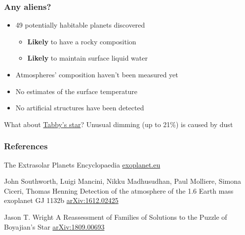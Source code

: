 \documentclass[aspectratio=169]{beamer}
\begin{document}
\begin{frame}
\frametitle{Any aliens?}
\begin{itemize}
\item 49 potentially habitable planets discovered
\begin{itemize}
\item {\bf Likely} to have a rocky composition
\item {\bf Likely} to maintain surface liquid water
\end{itemize}
\item Atmospheres' composition haven't been measured yet
\item No estimates of the surface temperature
\item No artificial structures have been detected
\end{itemize}
\begin{block}{What about \href{http://en.wikipedia.org/wiki/KIC_8462852}{Tabby's star}?}
Unusual dimming (up to 21\%) is caused by dust \cite{arXiv:1809.00693}
\end{block}
\end{frame}

\begin{frame}[allowframebreaks]
\frametitle{References}
\footnotesize{


\begin{thebibliography}{99}

The Extrasolar Planets Encyclopaedia
\newblock \href{http://exoplanet.eu}{exoplanet.eu}

John Southworth, Luigi Mancini, Nikku Madhusudhan, Paul Molliere, Simona Ciceri, Thomas Henning
\newblock Detection of the atmosphere of the 1.6 Earth mass exoplanet GJ 1132b
\newblock \href{http://arxiv.org/abs/1612.02425}{arXiv:1612.02425}

Jason T. Wright
\newblock A Reassessment of Families of Solutions to the Puzzle of Boyajian's Star
\newblock \href{https://arxiv.org/abs/1809.00693}{arXiv:1809.00693}
\end{thebibliography}
}
\end{frame}
\end{document}
